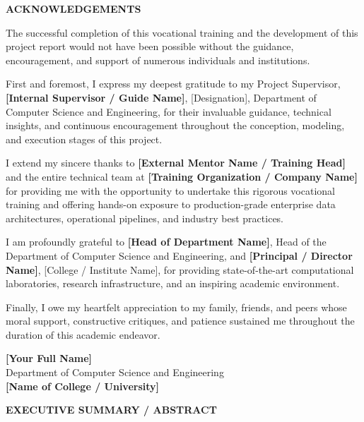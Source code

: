 \documentclass[11pt, a4paper]{article}
\begin{document}
\clearpage

\begin{center}
    {\LARGE \textbf{ACKNOWLEDGEMENTS}}\\[0.8cm]
\end{center}

The successful completion of this vocational training and the development of this project report would not have been possible without the guidance, encouragement, and support of numerous individuals and institutions.

First and foremost, I express my deepest gratitude to my Project Supervisor, \textbf{[Internal Supervisor / Guide Name]}, [Designation], Department of Computer Science and Engineering, for their invaluable guidance, technical insights, and continuous encouragement throughout the conception, modeling, and execution stages of this project.

I extend my sincere thanks to \textbf{[External Mentor Name / Training Head]} and the entire technical team at \textbf{[Training Organization / Company Name]} for providing me with the opportunity to undertake this rigorous vocational training and offering hands-on exposure to production-grade enterprise data architectures, operational pipelines, and industry best practices.

I am profoundly grateful to \textbf{[Head of Department Name]}, Head of the Department of Computer Science and Engineering, and \textbf{[Principal / Director Name]}, [College / Institute Name], for providing state-of-the-art computational laboratories, research infrastructure, and an inspiring academic environment.

Finally, I owe my heartfelt appreciation to my family, friends, and peers whose moral support, constructive critiques, and patience sustained me throughout the duration of this academic endeavor.

\vspace{1.5cm}

\noindent
\textbf{[Your Full Name]}\\
Department of Computer Science and Engineering\\
\textbf{[Name of College / University]}

\clearpage

\begin{center}
    {\LARGE \textbf{EXECUTIVE SUMMARY / ABSTRACT}}\\[0.8cm]
\end{center}
\end{document}
